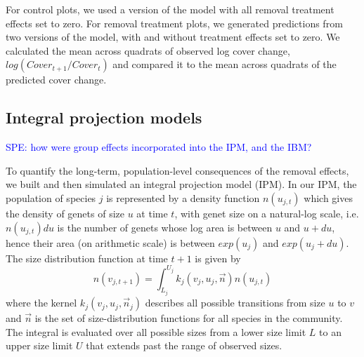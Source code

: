 \documentclass[11pt]{article}
\newcommand{\comment}{\textcolor{blue}}
\begin{document}
\begin{doublespacing}
For control plots, we used a version of the model with all removal treatment effects set to zero. For removal treatment plots, we generated predictions from two versions of the model, with and without treatment effects set to zero.  We calculated the mean across quadrats of observed log cover change, $log(Cover_{t+1}/Cover_t)$ and compared it to the mean across quadrats of the predicted cover change.

\subsection*{Integral projection models}

\comment{SPE: how were group effects incorporated into the IPM, and the IBM?} 

To quantify the long-term, population-level consequences of the removal effects, we built and then simulated an integral projection model (IPM). In our IPM, the population of species $j$ is represented by a density function $n(u_{j,t})$ which gives the density of genets of size $u$ at time $t$, with genet size on a natural-log scale, i.e. $n(u_{j,t})du$ is the number of genets whose log area is between $u$ and $u+du$, hence their area 
(on arithmetic scale) is between $exp(u_j)$ and $exp(u_j+du)$. The size distribution function at time $t+1$ is given by
\begin{equation}
n(v_{j,t+1})=\int_{L_j}^{U_j} k_j (v_j,u_j,{\vec{n}})n(u_{j,t})   
\label{eqn:IPM}
\end{equation}
where the kernel $k_j (v_j,u_j,\vec{n}_j)$ describes all possible transitions from size $u$ to $v$ and $\vec{n}$ 
is the set of size-distribution functions for all species in the community. The integral is evaluated over all possible sizes from a 
lower size limit $L$ to an upper size limit $U$ that extends past the range of observed sizes.   


\end{doublespacing}
\end{document}
